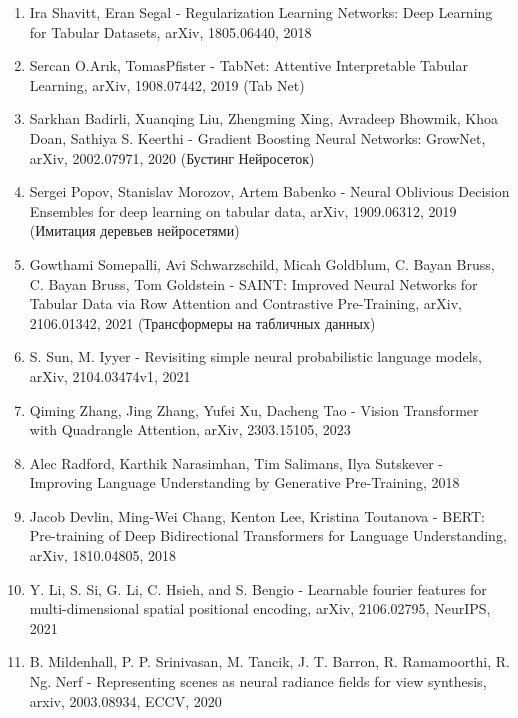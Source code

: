\documentclass[12pt]{article}
\begin{document}
\begin{enumerate}
    \item Ira Shavitt, Eran Segal - Regularization Learning Networks: Deep Learning for Tabular Datasets, arXiv, 1805.06440, 2018

    \item Sercan O.Arık, TomasPfister - TabNet: Attentive Interpretable Tabular Learning,  arXiv, 1908.07442, 2019 (Tab Net)

    \item Sarkhan Badirli, Xuanqing Liu, Zhengming Xing, Avradeep Bhowmik, Khoa Doan, Sathiya S. Keerthi - Gradient Boosting Neural Networks: GrowNet, arXiv, 2002.07971, 2020 (Бустинг Нейросеток)

    \item Sergei Popov, Stanislav Morozov, Artem Babenko - Neural Oblivious Decision Ensembles for deep learning on tabular data, arXiv, 1909.06312, 2019 (Имитация деревьев нейросетями)

    \item Gowthami Somepalli, Avi Schwarzschild, Micah Goldblum, C. Bayan Bruss, C. Bayan Bruss, Tom Goldstein - SAINT: Improved Neural Networks for Tabular Data via Row Attention and Contrastive Pre-Training, arXiv, 2106.01342, 2021 (Трансформеры на табличных данных)

    \item S. Sun, M. Iyyer - Revisiting simple neural probabilistic language models, arXiv, 2104.03474v1, 2021

    \item Qiming Zhang, Jing Zhang, Yufei Xu, Dacheng Tao - Vision Transformer with Quadrangle Attention, arXiv, 2303.15105, 2023

    \item Alec Radford, Karthik Narasimhan, Tim Salimans, Ilya Sutskever - Improving Language Understanding by Generative Pre-Training, 2018

    \item Jacob Devlin, Ming-Wei Chang, Kenton Lee, Kristina Toutanova - BERT: Pre-training of Deep Bidirectional Transformers for Language Understanding, arXiv, 1810.04805, 2018

    \item Y. Li, S. Si, G. Li, C. Hsieh, and S. Bengio - Learnable fourier features for multi-dimensional spatial positional encoding, arXiv, 2106.02795, NeurIPS, 2021

    \item B. Mildenhall, P. P. Srinivasan, M. Tancik, J. T. Barron, R. Ramamoorthi, R. Ng. Nerf - Representing scenes as neural radiance fields for view synthesis, arxiv, 2003.08934, ECCV, 2020


\end{enumerate}
\end{document}
